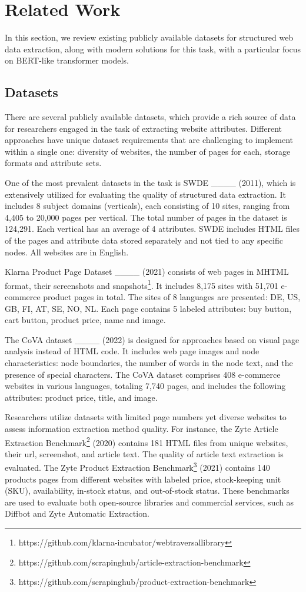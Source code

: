 \section{Related Work}
In this section, we review existing publicly available datasets for structured web data extraction, along with modern solutions for this task, with a particular focus on BERT-like transformer models.

\subsection{Datasets}

There are several publicly available datasets, which provide a rich source of data for researchers engaged in the task of extracting website attributes. Different approaches have unique dataset requirements that are challenging to implement within a single one: diversity of websites, the number of pages for each, storage formats and attribute sets.

One of the most prevalent datasets in the task is SWDE ____ (2011), which is extensively utilized for evaluating the quality of structured data extraction. It includes 8 subject domains (verticals), each consisting of 10 sites, ranging from 4,405 to 20,000 pages per vertical. The total number of pages in the dataset is 124,291. Each vertical has an average of 4 attributes. SWDE includes HTML files of the pages and attribute data stored separately and not tied to any specific nodes. All websites are in English.

Klarna Product Page Dataset ____ (2021) consists of web pages in MHTML format, their screenshots and snapshots\footnote{https://github.com/klarna-incubator/webtraversallibrary}. It includes 8,175 sites with 51,701 e-commerce product pages in total. The sites of 8 languages are presented: DE, US, GB, FI, AT, SE, NO, NL. Each page contains 5 labeled attributes: buy button, cart button, product price, name and image.

The CoVA dataset ____ (2022) is designed for approaches based on visual page analysis instead of HTML code. It includes web page images and node characteristics: node boundaries, the number of words in the node text, and the presence of special characters. The CoVA dataset comprises 408 e-commerce websites in various languages, totaling 7,740 pages, and includes the following attributes: product price, title, and image.

Researchers utilize datasets with limited page numbers yet diverse websites to assess information extraction method quality. For instance, the Zyte Article Extraction Benchmark\footnote{https://github.com/scrapinghub/article-extraction-benchmark} (2020) contains 181 HTML files from unique websites, their url, screenshot, and article text. The quality of article text extraction is evaluated. The Zyte Product Extraction Benchmark\footnote{https://github.com/scrapinghub/product-extraction-benchmark} (2021) contains 140 products pages from different websites with labeled price, stock-keeping unit (SKU), availability, in-stock status, and out-of-stock status. These benchmarks are used to evaluate both open-source libraries and commercial services, such as Diffbot and Zyte Automatic Extraction.

